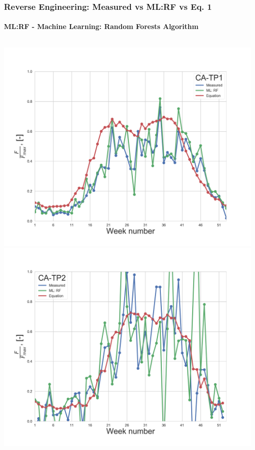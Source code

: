 \documentclass{beamer}
\begin{document}
\begin{frame}
\frametitle{Reverse Engineering: Measured vs ML:RF vs Eq. 1}
\framesubtitle{ML:RF - Machine Learning: Random Forests Algorithm}


\begin{columns}[t]
\centering
\includegraphics[width=\textwidth]{F_scaled_ML_ENF_Only_T_With9010_Quartiles/eq/CA-TP1.png}\\
\includegraphics[width=\textwidth]{F_scaled_ML_ENF_Only_T_With9010_Quartiles/eq/CA-TP2.png}


\end{columns}
\end{frame}
\end{document}
